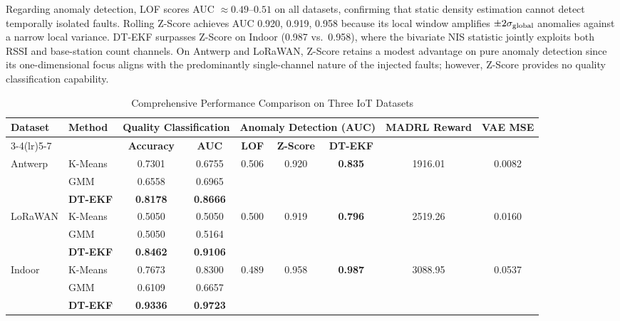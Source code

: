 \documentclass[conference]{IEEEtran}
\begin{document}
Regarding anomaly detection, LOF scores AUC $\approx0.49$--$0.51$ on
all datasets, confirming that static density estimation cannot detect
temporally isolated faults. Rolling Z-Score achieves AUC 0.920, 0.919,
0.958 because its local window amplifies $\pm2\sigma_{\rm global}$
anomalies against a narrow local variance. DT-EKF surpasses Z-Score on
Indoor (0.987 vs.\ 0.958), where the bivariate NIS statistic jointly
exploits both RSSI and base-station count channels. On Antwerp and
LoRaWAN, Z-Score retains a modest advantage on pure anomaly detection
since its one-dimensional focus aligns with the predominantly
single-channel nature of the injected faults; however, Z-Score provides
no quality classification capability.

\begin{table}[t]
\centering
\caption{Comprehensive Performance Comparison on Three IoT Datasets}
\label{tab:main_results}
\setlength{\tabcolsep}{4pt}
\begin{tabular}{llccccccc}
\toprule
\multirow{2}{*}{\textbf{Dataset}} &
\multirow{2}{*}{\textbf{Method}} &
\multicolumn{2}{c}{\textbf{Quality Classification}} &
\multicolumn{3}{c}{\textbf{Anomaly Detection (AUC)}} &
\multirow{2}{*}{\textbf{MADRL Reward}} &
\multirow{2}{*}{\textbf{VAE MSE}} \\
\cmidrule(lr){3-4}\cmidrule(lr){5-7}
 & & \textbf{Accuracy} & \textbf{AUC} &
\textbf{LOF} & \textbf{Z-Score} & \textbf{DT-EKF} & & \\
\midrule
\multirow{3}{*}{Antwerp}
 & K-Means & 0.7301 & 0.6755 &
   \multirow{3}{*}{0.506} & \multirow{3}{*}{0.920} &
   \multirow{3}{*}{\textbf{0.835}} &
   \multirow{3}{*}{1916.01} & \multirow{3}{*}{0.0082} \\
 & GMM     & 0.6558 & 0.6965 & & & & & \\
 & \textbf{DT-EKF} & \textbf{0.8178} & \textbf{0.8666} & & & & & \\
\midrule
\multirow{3}{*}{LoRaWAN}
 & K-Means & 0.5050 & 0.5050 &
   \multirow{3}{*}{0.500} & \multirow{3}{*}{0.919} &
   \multirow{3}{*}{\textbf{0.796}} &
   \multirow{3}{*}{2519.26} & \multirow{3}{*}{0.0160} \\
 & GMM     & 0.5050 & 0.5164 & & & & & \\
 & \textbf{DT-EKF} & \textbf{0.8462} & \textbf{0.9106} & & & & & \\
\midrule
\multirow{3}{*}{Indoor}
 & K-Means & 0.7673 & 0.8300 &
   \multirow{3}{*}{0.489} & \multirow{3}{*}{0.958} &
   \multirow{3}{*}{\textbf{0.987}} &
   \multirow{3}{*}{3088.95} & \multirow{3}{*}{0.0537} \\
 & GMM     & 0.6109 & 0.6657 & & & & & \\
 & \textbf{DT-EKF} & \textbf{0.9336} & \textbf{0.9723} & & & & & \\
\bottomrule
\end{tabular}
\end{table}
\end{document}
